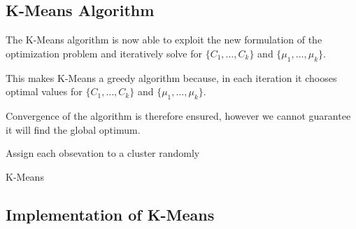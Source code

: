 \documentclass[aspectratio=169,10pt]{beamer}
\begin{document}
\subsection{K-Means Algorithm}
\begin{frame}{\secname}{\subsecname}
  The K-Means algorithm is now able to exploit the new formulation of the optimization problem and iteratively solve for $\{C_1, \ldots, C_k\}$ and $\{\mu_1, \ldots, \mu_k\}$.

  This makes K-Means a greedy algorithm because, in each iteration it chooses optimal values for $\{C_1, \ldots, C_k\}$ and $\{\mu_1, \ldots, \mu_k\}$.

  Convergence of the algorithm is therefore ensured, however we cannot guarantee it will find the global optimum.
\end{frame}

\begin{frame}{\secname}{\subsecname}
  \begingroup
  \footnotesize
  \begin{algorithm}[H]
    \DontPrintSemicolon
    Assign each obsevation to a cluster randomly\;
    \caption{K-Means}
  \end{algorithm}
  \endgroup
\end{frame}

\subsection{Implementation of K-Means}
  
  
  
\end{document}

